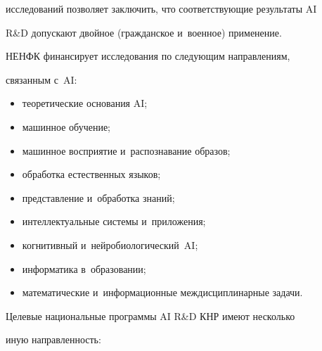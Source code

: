 исследований позволяет заключить, что со\-от\-вет\-ст\-ву\-ющие результаты AI 


R\&D допускают двойное (гражданское и~военное) применение.


     


     НЕНФК финансирует исследования по следующим направлениям, 


связанным с~AI:


     \begin{itemize}


\item теоретические основания AI;


\item машинное обучение;


\item машинное восприятие и~распознавание образов;


\item обработка естественных языков;


\item представление и~обработка знаний;


\item интеллектуальные сис\-те\-мы и~приложения;


\item когнитивный и~нейробиологический~AI;


\item информатика в~образовании;


\item математические и~информационные междисциплинарные задачи.


\end{itemize}


     


     Целевые национальные программы AI R\&D КНР имеют несколько 


иную направленность:


